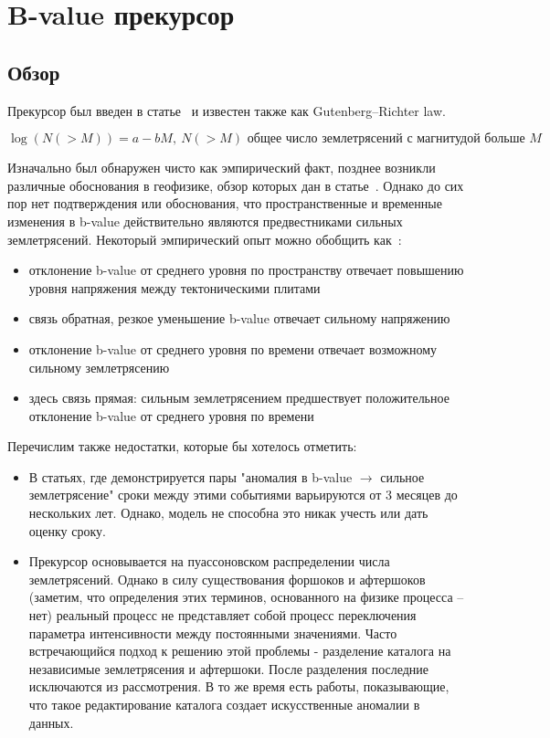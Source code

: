 \section{B-value прекурсор}

\subsection{Обзор }
Прекурсор был введен в статье~\cite{gr_b_value} и известен также как Gutenberg–Richter law. 

$$
\log(N(>M)) = a - bM,~N(>M)\text{ общее число землетрясений с магнитудой больше $M$}
$$

Изначально был обнаружен чисто как эмпирический факт, позднее возникли различные обоснования в геофизике, обзор которых дан в статье~\cite{physic_b}.
Однако до сих пор нет подтверждения или обоснования, что пространственные и временные изменения в b-value действительно являются предвестниками сильных землетрясений. Некоторый эмпирический опыт можно обобщить как~\cite{b_one, b_two, b_three}:

\begin{itemize}
\item отклонение b-value от среднего уровня по пространству отвечает повышению уровня напряжения между тектоническими плитами
\item связь обратная, резкое уменьшение b-value отвечает сильному напряжению
\item отклонение b-value от среднего уровня по времени отвечает возможному сильному землетрясению
\item здесь связь прямая: сильным землетрясением предшествует положительное отклонение b-value от среднего уровня по времени 
\end{itemize}

Перечислим также недостатки, которые бы хотелось отметить:

\begin{itemize}
\item В статьях, где демонстрируется пары "аномалия в b-value $\to$ сильное землетрясение" сроки между этими событиями варьируются от 3 месяцев до нескольких лет. Однако, модель не способна это никак учесть или дать оценку сроку.
\item Прекурсор основывается на пуассоновском распределении числа землетрясений. Однако в силу существования форшоков и афтершоков (заметим, что определения этих терминов, основанного на физике процесса -- нет) реальный процесс не представляет собой процесс переключения параметра интенсивности между постоянными значениями. Часто встречающийся подход к решению этой проблемы - разделение каталога на независимые землетрясения и афтершоки. После разделения последние исключаются из рассмотрения.  В то же время есть работы, показывающие, что такое редактирование каталога создает искусственные аномалии в данных. 
\end{itemize}

